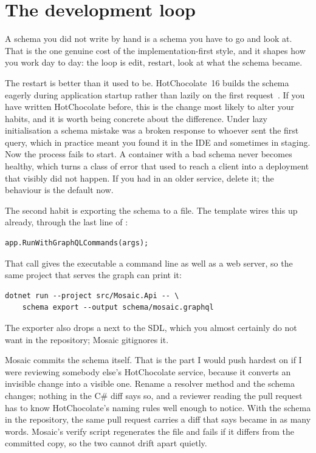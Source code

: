 \section{The development loop}
\label{sec:ch02-dev-loop}

A schema you did not write by hand is a schema you have to go and look at. That
is the one genuine cost of the implementation-first style, and it shapes how you
work day to day: the loop is edit, restart, look at what the schema became.

%
The restart is better than it used to be. HotChocolate~16 builds the schema
eagerly during application startup rather than lazily on the first
request~\autocite{chillicream2026migrate16}. If you have written HotChocolate
before, this is the change most likely to alter your habits, and it is worth
being concrete about the difference. Under lazy initialisation a schema mistake
was a broken response to whoever sent the first query, which in practice meant
you found it in the IDE and sometimes in staging. Now the process fails to start.
A container with a bad schema never becomes healthy, which turns a class of
error that used to reach a client into a deployment that visibly did not happen.
If you had  in an older service, delete it; the
behaviour is the default now.

%
The second habit is exporting the schema to a file. The template wires this up
already, through the last line of :

\begin{verbatim}
app.RunWithGraphQLCommands(args);
\end{verbatim}

That call gives the executable a command line as well as a web server, so the
same project that serves the graph can print it:

\begin{verbatim}
dotnet run --project src/Mosaic.Api -- \
    schema export --output schema/mosaic.graphql
\end{verbatim}

The exporter also drops a  next to the SDL, which you
almost certainly do not want in the repository; Mosaic gitignores it.

Mosaic commits the schema itself. That is the part I would push hardest on if I
were reviewing somebody else's HotChocolate service, because it converts an
invisible change into a visible one. Rename a resolver method and the schema changes;
nothing in the C\# diff says so, and a reviewer reading the pull request has to
know HotChocolate's naming rules well enough to notice. With the schema in the
repository, the same pull request carries a diff that says \code{price} became
\code{unitPrice} in as many words. Mosaic's verify script regenerates the file
and fails if it differs from the committed copy, so the two cannot drift apart
quietly.

